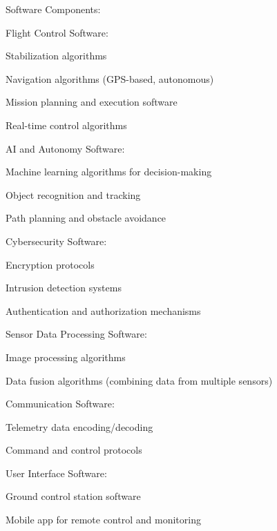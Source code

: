 Software Components:

Flight Control Software:

Stabilization algorithms

Navigation algorithms (GPS-based, autonomous)

Mission planning and execution software

Real-time control algorithms

AI and Autonomy Software:

Machine learning algorithms for decision-making

Object recognition and tracking

Path planning and obstacle avoidance

Cybersecurity Software:

Encryption protocols

Intrusion detection systems

Authentication and authorization mechanisms

Sensor Data Processing Software:

Image processing algorithms

Data fusion algorithms (combining data from multiple sensors)

Communication Software:

Telemetry data encoding/decoding

Command and control protocols

User Interface Software:

Ground control station software

Mobile app for remote control and monitoring